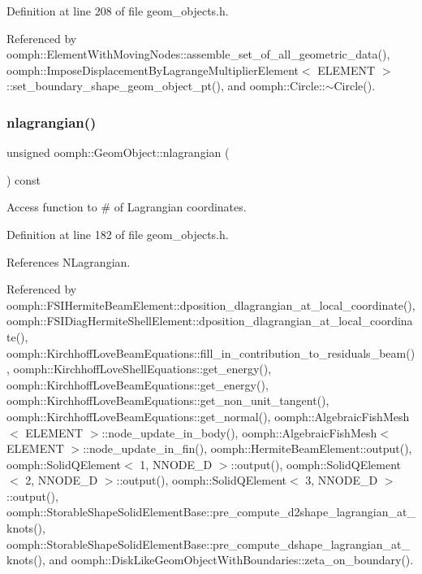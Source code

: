 Definition at line 208 of file geom\+\_\+objects.\+h.



Referenced by oomph\+::\+Element\+With\+Moving\+Nodes\+::assemble\+\_\+set\+\_\+of\+\_\+all\+\_\+geometric\+\_\+data(), oomph\+::\+Impose\+Displacement\+By\+Lagrange\+Multiplier\+Element$<$ E\+L\+E\+M\+E\+N\+T $>$\+::set\+\_\+boundary\+\_\+shape\+\_\+geom\+\_\+object\+\_\+pt(), and oomph\+::\+Circle\+::$\sim$\+Circle().

\mbox{\label{classoomph_1_1GeomObject_ae8974ee138b0f879c459340a9f05e06c}} 
\subsubsection{\texorpdfstring{nlagrangian()}{nlagrangian()}}
{\footnotesize\ttfamily unsigned oomph\+::\+Geom\+Object\+::nlagrangian (\begin{DoxyParamCaption}{ }\end{DoxyParamCaption}) const\hspace{0.3cm}{\ttfamily [inline]}}



Access function to \# of Lagrangian coordinates. 



Definition at line 182 of file geom\+\_\+objects.\+h.



References N\+Lagrangian.



Referenced by oomph\+::\+F\+S\+I\+Hermite\+Beam\+Element\+::dposition\+\_\+dlagrangian\+\_\+at\+\_\+local\+\_\+coordinate(), oomph\+::\+F\+S\+I\+Diag\+Hermite\+Shell\+Element\+::dposition\+\_\+dlagrangian\+\_\+at\+\_\+local\+\_\+coordinate(), oomph\+::\+Kirchhoff\+Love\+Beam\+Equations\+::fill\+\_\+in\+\_\+contribution\+\_\+to\+\_\+residuals\+\_\+beam(), oomph\+::\+Kirchhoff\+Love\+Shell\+Equations\+::get\+\_\+energy(), oomph\+::\+Kirchhoff\+Love\+Beam\+Equations\+::get\+\_\+energy(), oomph\+::\+Kirchhoff\+Love\+Beam\+Equations\+::get\+\_\+non\+\_\+unit\+\_\+tangent(), oomph\+::\+Kirchhoff\+Love\+Beam\+Equations\+::get\+\_\+normal(), oomph\+::\+Algebraic\+Fish\+Mesh$<$ E\+L\+E\+M\+E\+N\+T $>$\+::node\+\_\+update\+\_\+in\+\_\+body(), oomph\+::\+Algebraic\+Fish\+Mesh$<$ E\+L\+E\+M\+E\+N\+T $>$\+::node\+\_\+update\+\_\+in\+\_\+fin(), oomph\+::\+Hermite\+Beam\+Element\+::output(), oomph\+::\+Solid\+Q\+Element$<$ 1, N\+N\+O\+D\+E\+\_\+D $>$\+::output(), oomph\+::\+Solid\+Q\+Element$<$ 2, N\+N\+O\+D\+E\+\_\+D $>$\+::output(), oomph\+::\+Solid\+Q\+Element$<$ 3, N\+N\+O\+D\+E\+\_\+D $>$\+::output(), oomph\+::\+Storable\+Shape\+Solid\+Element\+Base\+::pre\+\_\+compute\+\_\+d2shape\+\_\+lagrangian\+\_\+at\+\_\+knots(), oomph\+::\+Storable\+Shape\+Solid\+Element\+Base\+::pre\+\_\+compute\+\_\+dshape\+\_\+lagrangian\+\_\+at\+\_\+knots(), and oomph\+::\+Disk\+Like\+Geom\+Object\+With\+Boundaries\+::zeta\+\_\+on\+\_\+boundary().

